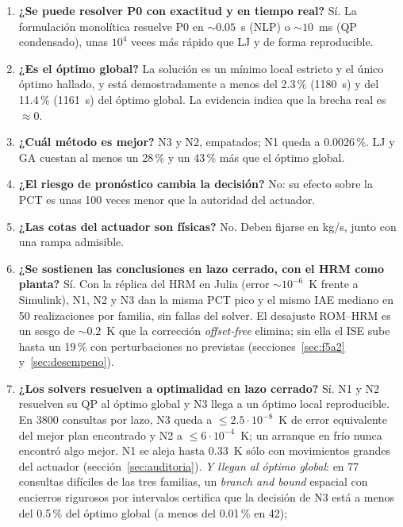 \begin{enumerate}[label=\textbf{Q\arabic*.}]
  \item \textbf{¿Se puede resolver P0 con exactitud y en tiempo real?} Sí. La formulación
        monolítica resuelve P0 en $\sim0.05$~s (NLP) o $\sim10$~ms (QP condensado), unas
        $10^4$ veces más rápido que LJ y de forma reproducible.
  \item \textbf{¿Es el óptimo global?} La solución es un mínimo local estricto y el único
        óptimo hallado, y está demostradamente a menos del 2.3\,\% (1180~s) y del 11.4\,\%
        (1161~s) del óptimo global. La evidencia indica que la brecha real es $\approx0$.
  \item \textbf{¿Cuál método es mejor?} N3 y N2, empatados; N1 queda a 0.0026\,\%. LJ y GA
        cuestan al menos un 28\,\% y un 43\,\% más que el óptimo global.
  \item \textbf{¿El riesgo de pronóstico cambia la decisión?} No: su efecto sobre la PCT es
        unas 100 veces menor que la autoridad del actuador.
  \item \textbf{¿Las cotas del actuador son físicas?} No. Deben fijarse en kg/s, junto con una
        rampa admisible.
  \item \textbf{¿Se sostienen las conclusiones en lazo cerrado, con el HRM como planta?} Sí.
        Con la réplica del HRM en Julia (error $\sim10^{-6}$~K frente a Simulink), N1, N2 y N3
        dan la misma PCT pico y el mismo IAE mediano en 50 realizaciones por familia, sin
        fallas del solver. El desajuste ROM--HRM es un sesgo de $\sim0.2$~K que la corrección
        \emph{offset-free} elimina; sin ella el ISE sube hasta un 19\,\% con perturbaciones no
        previstas (secciones~\ref{sec:f5a2} y~\ref{sec:desempeno}).
  \item \textbf{¿Los solvers resuelven a optimalidad en lazo cerrado?} Sí. N1 y N2 resuelven su
        QP al óptimo global y N3 llega a un óptimo local reproducible. En 3800 consultas por
        lazo, N3 queda a $\le2.5\cdot10^{-8}$~K de error equivalente del mejor plan encontrado
        y N2 a $\le6\cdot10^{-4}$~K; un arranque en frío nunca encontró algo mejor. N1 se aleja
        hasta 0.33~K sólo con movimientos grandes del actuador (sección~\ref{sec:auditoria}).
        \emph{Y llegan al óptimo global}: en 77 consultas difíciles de las tres familias, un
        \emph{branch and bound} espacial con encierros rigurosos por intervalos certifica que la
        decisión de N3 está a menos del 0.5\,\% del óptimo global (a menos del 0.01\,\% en 42);

\end{enumerate}
